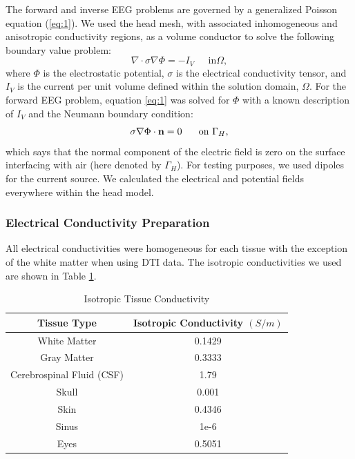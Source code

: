 The forward and inverse EEG problems are governed by a generalized Poisson equation (\ref{eq:1}). We used the head mesh, with associated inhomogeneous and anisotropic conductivity regions, as a volume conductor to solve the following boundary value problem:
%
\begin{equation}
\label{eq:1} \nabla\cdot\sigma\nabla\Phi = -I_{V} \;\;\;\;\mbox{ in
}\Omega,
\end{equation} 
%
where $\Phi$ is the electrostatic potential, $\sigma$ is the electrical conductivity tensor, and $I_{V}$ is the current per unit volume defined within the solution domain, $\Omega$. For the forward EEG problem, equation \ref{eq:1} was solved for $\Phi$ with a known description of $I_{V}$ and the Neumann boundary condition:
%
\begin{equation} \sigma\nabla\Phi\cdot{\bf
n} = 0\;\;\;\;\;\mbox{ on }\Gamma_{H}, 
\end{equation} 
%
which says that the normal component of the electric field is zero on the surface interfacing with air (here denoted by $\Gamma_{H}$). For testing purposes, we used dipoles for the current source. We calculated the electrical and potential fields everywhere within the head model. \cite{SCI:Joh2015c}

\subsubsection{Electrical Conductivity Preparation}
\label{sec:cond}

All electrical conductivities were homogeneous for each tissue with the exception of the white matter when using DTI data. The isotropic conductivities \cite{ref:cond} we used are shown in Table \ref{tab:cond}.

\begin{table}[H]
\centering
\caption{Isotropic Tissue Conductivity}
\label{tab:cond}
\begin{tabular}{|c|c|}
\hline
Tissue Type               & Isotropic Conductivity $(S/m)$ \\ \hline
\hline
White Matter              & 0.1429                         \\ \hline
Gray Matter               & 0.3333                         \\ \hline
Cerebrospinal Fluid (CSF) & 1.79                           \\ \hline
Skull                     & 0.001                          \\ \hline
Skin                      & 0.4346                         \\ \hline
Sinus                     & 1e-6                           \\ \hline
Eyes                      & 0.5051                         \\ \hline
\end{tabular}
\end{table}

